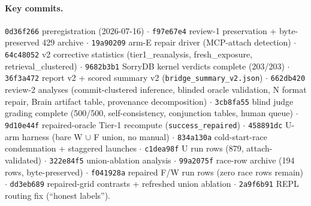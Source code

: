 \documentclass[10pt]{article}
\newcommand{\code}[1]{\texttt{#1}}
\begin{document}
\paragraph{Key commits.} \code{0d36f266} preregistration (2026-07-16)
$\cdot$ \code{f97e67e4} review-1 preservation + byte-preserved 429
archive $\cdot$ \code{19a90209} arm-E repair driver (MCP-attach
detection) $\cdot$ \code{64c48052} v2 corrective statistics
(tier1\_reanalysis, fresh\_exposure, retrieval\_clustered) $\cdot$
\code{9682b3b1} SorryDB kernel verdicts complete (203/203) $\cdot$
\code{36f3a472} report v2 + scored summary v2
(\code{bridge\_summary\_v2.json}) $\cdot$ \code{662db420} review-2
analyses (commit-clustered inference, blinded oracle validation, N
format repair, Brain artifact table, provenance decomposition) $\cdot$
\code{3cb8fa55} blind judge grading complete (500/500,
self-consistency, conjunction tables, human queue) $\cdot$
\code{9d10e44f} repaired-oracle Tier-1 recompute
(\code{success\_repaired}) $\cdot$ \code{458891dc} U-arm harness (bare
W $\cup$ F union, no manual) $\cdot$ \code{834a130a} cold-start-race
condemnation + staggered launches $\cdot$ \code{c1dea98f} U run rows
(879, attach-validated) $\cdot$ \code{322e84f5} union-ablation
analysis $\cdot$ \code{99a2075f} race-row archive (194 rows,
byte-preserved) $\cdot$ \code{f041928a} repaired F/W run rows (zero
race rows remain) $\cdot$ \code{dd3eb689} repaired-grid contrasts +
refreshed union ablation $\cdot$ \code{2a9f6b91} REPL routing fix
(``honest labels'').
\end{document}
